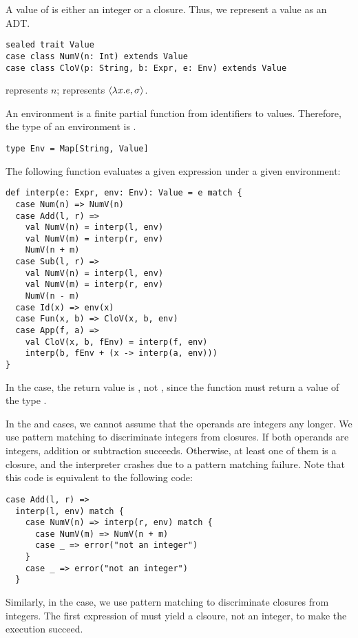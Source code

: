 A value of \lang is either an integer or a closure. Thus, we represent a value
as an ADT.

\begin{verbatim}
sealed trait Value
case class NumV(n: Int) extends Value
case class CloV(p: String, b: Expr, e: Env) extends Value
\end{verbatim}

 represents $n$;  represents
$\langle\lambda x.e,\sigma\rangle$.

An environment is a finite partial function from identifiers to values.
Therefore, the type of an environment is .

\begin{verbatim}
type Env = Map[String, Value]
\end{verbatim}

The following function evaluates a given expression under a given environment:

\begin{verbatim}
def interp(e: Expr, env: Env): Value = e match {
  case Num(n) => NumV(n)
  case Add(l, r) =>
    val NumV(n) = interp(l, env)
    val NumV(m) = interp(r, env)
    NumV(n + m)
  case Sub(l, r) =>
    val NumV(n) = interp(l, env)
    val NumV(m) = interp(r, env)
    NumV(n - m)
  case Id(x) => env(x)
  case Fun(x, b) => CloV(x, b, env)
  case App(f, a) =>
    val CloV(x, b, fEnv) = interp(f, env)
    interp(b, fEnv + (x -> interp(a, env)))
}
\end{verbatim}

In the  case, the return value is , not ,
since the function must return a value of the type .

In the
 and  cases, we cannot assume that the operands are integers
any longer. We use pattern matching to discriminate integers from closures. If
both operands are integers, addition or subtraction succeeds. Otherwise, at
least one of them is a closure, and the interpreter crashes due to a pattern
matching failure. Note that this code is equivalent to the following code:

\begin{verbatim}
case Add(l, r) =>
  interp(l, env) match {
    case NumV(n) => interp(r, env) match {
      case NumV(m) => NumV(n + m)
      case _ => error("not an integer")
    }
    case _ => error("not an integer")
  }
\end{verbatim}

Similarly, in the  case, we use pattern matching to discriminate
closures from integers. The first expression of  must yield a clsoure,
not an integer, to make the execution succeed.


